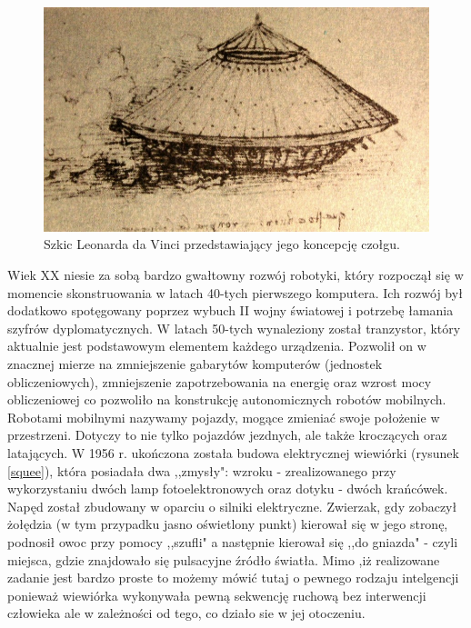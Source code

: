   \begin{figure}[H]
    \begin{center}
      \includegraphics[scale=0.3]{imgs/Leonardo_tank.jpg}
 	\caption[Czołg Leonarda da Vinci]{\small{Szkic Leonarda da Vinci przedstawiający jego koncepcję czołgu.}\footnotemark}
	\label{czolg_leon}
    \end{center}
  \end{figure}
Wiek XX niesie za sobą bardzo gwałtowny rozwój robotyki, który rozpoczął się w momencie skonstruowania w latach 40-tych pierwszego komputera. Ich rozwój był dodatkowo spotęgowany poprzez wybuch II wojny światowej i potrzebę łamania szyfrów dyplomatycznych.
W latach 50-tych wynaleziony został tranzystor, który aktualnie jest podstawowym elementem każdego urządzenia. Pozwolił on w znacznej mierze na zmniejszenie gabarytów komputerów (jednostek obliczeniowych), zmniejszenie zapotrzebowania na energię oraz wzrost mocy obliczeniowej co pozwoliło na konstrukcję autonomicznych robotów mobilnych.
Robotami mobilnymi nazywamy pojazdy, mogące zmieniać swoje położenie w przestrzeni. Dotyczy to nie tylko pojazdów jezdnych, ale także kroczących oraz latających. 
W 1956 r. ukończona została budowa elektrycznej wiewiórki\cite{robot_squee} (rysunek \ref{squee}), która posiadała dwa ,,zmysły": wzroku - zrealizowanego przy wykorzystaniu dwóch lamp fotoelektronowych oraz dotyku - dwóch krańcówek.  Napęd został zbudowany w oparciu o silniki elektryczne. Zwierzak, gdy zobaczył żołędzia (w tym przypadku jasno oświetlony punkt) kierował się w jego stronę, podnosił owoc przy pomocy ,,szufli" a następnie kierował się ,,do gniazda" - czyli miejsca, gdzie znajdowało się pulsacyjne źródło światła. Mimo ,iż realizowane zadanie jest bardzo proste to możemy mówić tutaj o pewnego rodzaju intelgencji ponieważ wiewiórka wykonywała pewną sekwencję ruchową bez interwencji człowieka ale w zależności od tego, co działo sie w jej otoczeniu.

